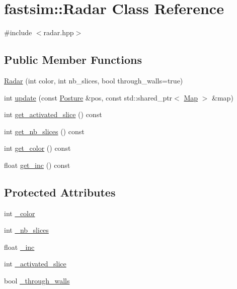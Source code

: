 \hypertarget{classfastsim_1_1_radar}{}\section{fastsim\+:\+:Radar Class Reference}
\label{classfastsim_1_1_radar}


{\ttfamily \#include $<$radar.\+hpp$>$}

\subsection*{Public Member Functions}
\begin{DoxyCompactItemize}
\item 
\hyperlink{classfastsim_1_1_radar_af4dc54a74146f1eab525d4b586dd6eaf}{Radar} (int color, int nb\+\_\+slices, bool through\+\_\+walls=true)
\item 
int \hyperlink{classfastsim_1_1_radar_ac7d274f901aa59d80958071930abccf4}{update} (const \hyperlink{classfastsim_1_1_posture}{Posture} \&pos, const std\+::shared\+\_\+ptr$<$ \hyperlink{classfastsim_1_1_map}{Map} $>$ \&map)
\item 
int \hyperlink{classfastsim_1_1_radar_ad875860fe38f22eed3aba0ccdbf75962}{get\+\_\+activated\+\_\+slice} () const 
\item 
int \hyperlink{classfastsim_1_1_radar_ade7e3d063d1974834666c8be12987dfe}{get\+\_\+nb\+\_\+slices} () const 
\item 
int \hyperlink{classfastsim_1_1_radar_a08e8c6e32c341e0e408ad830403dfe70}{get\+\_\+color} () const 
\item 
float \hyperlink{classfastsim_1_1_radar_a22b1700276cd2f06886eb909221a600c}{get\+\_\+inc} () const 
\end{DoxyCompactItemize}
\subsection*{Protected Attributes}
\begin{DoxyCompactItemize}
\item 
int \hyperlink{classfastsim_1_1_radar_a80615a274658f496d90006add0c8dedd}{\+\_\+color}
\item 
int \hyperlink{classfastsim_1_1_radar_aacd45ca03580ecdb9690dccac0e7d1d1}{\+\_\+nb\+\_\+slices}
\item 
float \hyperlink{classfastsim_1_1_radar_acc5ce02509c2f3e85e71b7f99c640669}{\+\_\+inc}
\item 
int \hyperlink{classfastsim_1_1_radar_a4101ec2b300ba432f57d078c97e8ffc3}{\+\_\+activated\+\_\+slice}
\item 
bool \hyperlink{classfastsim_1_1_radar_a6da26c33d2126d48fe77c06ba8f1de03}{\+\_\+through\+\_\+walls}
\end{DoxyCompactItemize}


